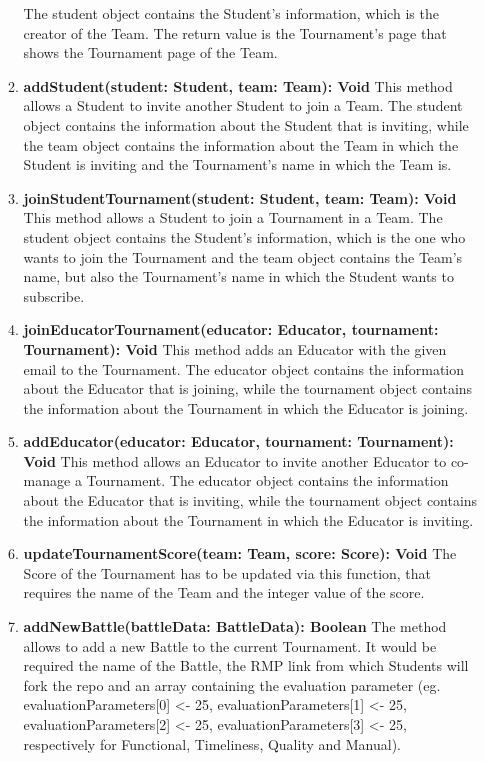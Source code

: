 \begin{enumerate}
\begin{enumerate}[label=$\bullet$]
            The student object contains the Student's information, which is the creator of the Team. The return value is the Tournament's page that shows the Tournament page of the Team.
            \item \textbf{addStudent(student: Student, team: Team): Void} This method allows a Student to invite another Student to join a Team. The student object contains the information about the Student that is inviting, while the team
            object contains the information about the Team in which the Student is inviting and the Tournament's name in which the Team is.
            \item \textbf{joinStudentTournament(student: Student, team: Team): Void} This method allows a Student to join a Tournament in a Team. The student object contains the Student's information, which is the one who wants to join 
            the Tournament and the team object contains the Team's name, but also the Tournament's name in which the Student wants to subscribe.
            \item \textbf{joinEducatorTournament(educator: Educator, tournament: Tournament): Void} This method adds an Educator with the given email to the Tournament. The educator object contains the information about the Educator
            that is joining, while the tournament object contains the information about the Tournament in which the Educator is joining.
            \item \textbf{addEducator(educator: Educator, tournament: Tournament): Void} This method allows an Educator to invite another Educator to co-manage a Tournament. The educator object contains the information about the Educator
            that is inviting, while the tournament object contains the information about the Tournament in which the Educator is inviting.
            \item \textbf{updateTournamentScore(team: Team, score: Score): Void} The Score of the Tournament has to be updated via this function, that requires the name of the Team and the integer value of the score.
            \item \textbf{addNewBattle(battleData: BattleData): Boolean} The method allows to add a new Battle to the current Tournament. It would be required the name of the Battle, 
            the RMP link from which Students will fork the repo and an array containing the evaluation parameter (eg. evaluationParameters[0] <- 25, evaluationParameters[1] <- 25, evaluationParameters[2] <- 25, evaluationParameters[3] <- 25,
            respectively for Functional, Timeliness, Quality and Manual).

\end{enumerate}
\end{enumerate}
